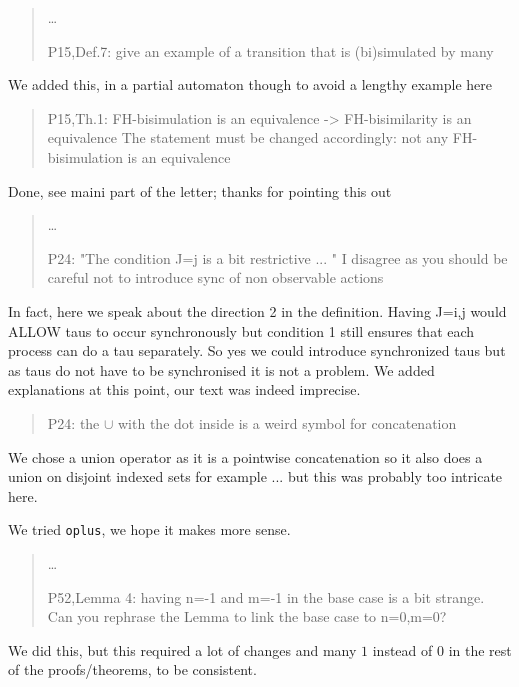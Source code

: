 \documentclass[10pt]{article}
\newenvironment{review}{\bgroup\itshape\begin{quote}}{\end{quote}\egroup}
\begin{document}
\begin{review}
\ldots

P15,Def.7: give an example of a transition that is (bi)simulated by many
\end{review}

We added this, in a partial automaton though to avoid a lengthy example here
\begin{review}
P15,Th.1: FH-bisimulation is an equivalence -> FH-bisimilarity is an equivalence
The statement must be changed accordingly: not any FH-bisimulation is an equivalence
\end{review}
Done, see maini part of the letter; thanks for pointing this out

\begin{review}
\ldots

P24: "The condition J={j} is a bit restrictive ... " I disagree as you should be careful not to introduce sync of non observable actions
\end{review}
 In fact, here we speak about the direction 2 in the definition. Having J={i,j} would ALLOW taus to occur synchronously but condition 1 still ensures that each process can do a tau separately. So yes we could introduce synchronized taus but as taus do not have to be synchronised it is not a problem.
We added explanations at this point, our text was indeed imprecise. 

\begin{review}

P24: the $\cup$ with the dot inside is a weird symbol for concatenation

\end{review}
We chose a union operator as it is a pointwise concatenation so it also does a union on disjoint indexed sets for example ... but this was probably too intricate here.

We tried \texttt{oplus}, we hope it makes more sense.

\begin{review}
\ldots

P52,Lemma 4: having n=-1 and m=-1 in the base case is a bit strange. Can you rephrase the Lemma to link the base case to n=0,m=0?
\end{review}
We did this, but this required a lot of changes and many $1$ instead of $0$ in the rest of the proofs/theorems, to be consistent.
\end{document}
